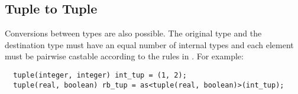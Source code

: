 \documentclass[../gazprea.tex]{subfiles}
\begin{document}
\subsection{Tuple to Tuple}
\label{ssec:typeCasting_ttot}
Conversions between  types are also possible. The original type and the destination type
must have an equal number of internal types and each element must be pairwise castable according to
the rules in . For example:
\begin{lstlisting}
  tuple(integer, integer) int_tup = (1, 2);
  tuple(real, boolean) rb_tup = as<tuple(real, boolean)>(int_tup);
\end{lstlisting}
\end{document}

